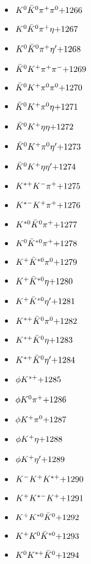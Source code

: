 \begin{multicols}{3}
\begin{itemize}
 \item $ K^{0} \bar{K}^{0} \pi^{+} \pi^{0} \hfill{+1266}$
 \item $ K^{0} \bar{K}^{0} \pi^{+} \eta \hfill{+1267}$
 \item $ K^{0} \bar{K}^{0} \pi^{+} {\eta^{\prime}} \hfill{+1268}$
 \item $ \bar{K}^{0} K^{+} \pi^{+} \pi^{-} \hfill{+1269}$
 \item $ \bar{K}^{0} K^{+} \pi^{0} \pi^{0} \hfill{+1270}$
 \item $ \bar{K}^{0} K^{+} \pi^{0} \eta \hfill{+1271}$
 \item $ \bar{K}^{0} K^{+} \eta \eta \hfill{+1272}$
 \item $ \bar{K}^{0} K^{+} \pi^{0} {\eta^{\prime}} \hfill{+1273}$
 \item $ \bar{K}^{0} K^{+} \eta {\eta^{\prime}} \hfill{+1274}$
 \item $ K^{*+} K^{-} \pi^{+} \hfill{+1275}$
 \item $ K^{*-} K^{+} \pi^{+} \hfill{+1276}$
 \item $ K^{*0} \bar{K}^{0} \pi^{+} \hfill{+1277}$
 \item $ K^{0} \bar{K}^{*0} \pi^{+} \hfill{+1278}$
 \item $ K^{+} \bar{K}^{*0} \pi^{0} \hfill{+1279}$
 \item $ K^{+} \bar{K}^{*0} \eta \hfill{+1280}$
 \item $ K^{+} \bar{K}^{*0} {\eta^{\prime}} \hfill{+1281}$
 \item $ K^{*+} \bar{K}^{0} \pi^{0} \hfill{+1282}$
 \item $ K^{*+} \bar{K}^{0} \eta \hfill{+1283}$
 \item $ K^{*+} \bar{K}^{0} {\eta^{\prime}} \hfill{+1284}$
 \item $ \phi K^{*+} \hfill{+1285}$
 \item $ \phi K^{0} \pi^{+} \hfill{+1286}$
 \item $ \phi K^{+} \pi^{0} \hfill{+1287}$
 \item $ \phi K^{+} \eta \hfill{+1288}$
 \item $ \phi K^{+} {\eta^{\prime}} \hfill{+1289}$
 \item $ K^{-} K^{+} K^{*+} \hfill{+1290}$
 \item $ K^{+} K^{*-} K^{+} \hfill{+1291}$
 \item $ K^{+} K^{*0} \bar{K}^{0} \hfill{+1292}$
 \item $ K^{+} K^{0} \bar{K}^{*0} \hfill{+1293}$
 \item $ K^{0} K^{*+} \bar{K}^{0} \hfill{+1294}$

\end{itemize}
\end{multicols}
